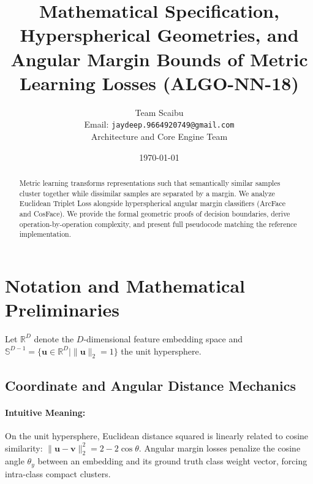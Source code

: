 \documentclass[11pt]{article}
\title{\textbf{Mathematical Specification, Hyperspherical Geometries, and Angular Margin Bounds of Metric Learning Losses (ALGO-NN-18)}}
\author{Team Scaibu \\ \small Email: \texttt{jaydeep.9664920749@gmail.com} \\ \small Architecture and Core Engine Team}
\date{\today}
\begin{document}
\maketitle

\begin{abstract}
Metric learning transforms representations such that semantically similar samples cluster together while dissimilar samples are separated by a margin. We analyze Euclidean Triplet Loss alongside hyperspherical angular margin classifiers (ArcFace and CosFace). We provide the formal geometric proofs of decision boundaries, derive operation-by-operation complexity, and present full pseudocode matching the reference implementation.
\end{abstract}

\section{Notation and Mathematical Preliminaries}
\label{sec:notation}

Let $\mathbb{R}^D$ denote the $D$-dimensional feature embedding space and $\mathbb{S}^{D-1} = \{\mathbf{u} \in \mathbb{R}^D \mid \|\mathbf{u}\|_2 = 1\}$ the unit hypersphere.

\subsection{Coordinate and Angular Distance Mechanics}
\paragraph{Intuitive Meaning:} On the unit hypersphere, Euclidean distance squared is linearly related to cosine similarity: $\|\mathbf{u} - \mathbf{v}\|_2^2 = 2 - 2 \cos\theta$. Angular margin losses penalize the cosine angle $\theta_y$ between an embedding and its ground truth class weight vector, forcing intra-class compact clusters.
\end{document}
